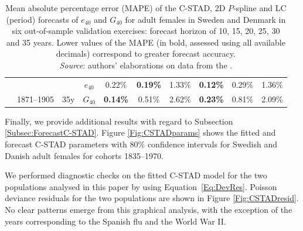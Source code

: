 \documentclass[11pt, a4paper]{article}
\begin{document}
\begin{table}[h!]
\begin{tabular}{ccccccc|ccc}
		\hhline{|----------|}
		\rowcolor{my-grey} 
		\multicolumn{1}{c}{\cellcolor{my-grey}}   &   
		\multicolumn{1}{c}{\cellcolor{my-grey}}   &  \multicolumn{1}{c}{\cellcolor{my-grey}}                & \multicolumn{1}{c|}{\cellcolor{my-grey}$e_{40}$} & 0.22\% &  \textbf{0.19\%} & 1.33\% & \textbf{0.12\%} &  0.29\% & 1.36\%  \\
		\rowcolor{my-grey}           
		\multicolumn{1}{c}{\multirow{-2}{*}{\cellcolor{my-grey}1835--1870}}           &
		\multicolumn{1}{c}{\multirow{-2}{*}{\cellcolor{my-grey}1871--1905}}               &
		\multicolumn{1}{c}{\multirow{-2}{*}{\cellcolor{my-grey}35y}}               & \multicolumn{1}{c|}{\cellcolor{my-grey}$G_{40}$} & \textbf{0.14\%} &   0.51\% & 2.62\% & \textbf{0.23\%} &  0.81\% & 2.09\%   \\		
		
		\bottomrule 
		
	\end{tabular}
	\caption{Mean absolute percentage error (MAPE) of the C-STAD, 2D $P$-spline {\color{red}and LC (period)} forecasts of $e_{40}$ and $G_{40}$ for adult females in Sweden and Denmark in six out-of-sample validation exercises: forecast horizon of 10, 15, 20, 25, 30 and 35 years. Lower values of the MAPE (in bold, assessed using all available decimals) correspond to greater forecast accuracy.\\ \small \textit{Source}: authors' elaborations on data from the \cite{HMD}. }\label{Table:MAPE}
\end{table}

{\color{red}Finally}, we provide additional results with regard to Subsection \ref{Subsec:ForecastC-STAD}. Figure \ref{Fig:CSTADparams} shows the fitted and forecast C-STAD parameters with 80\% confidence intervals for Swedish and Danish adult females for cohorts 1835--1970.

We performed diagnostic checks on the fitted C-STAD model for the two populations analysed in this paper by using Equation~\eqref{Eq:DevRes}. Poisson deviance residuals for the two populations are shown in Figure \ref{Fig:CSTADresid}. No clear patterns emerge from this graphical analysis, with the exception of the years corresponding to the Spanish flu and the World War II.
\end{document}
